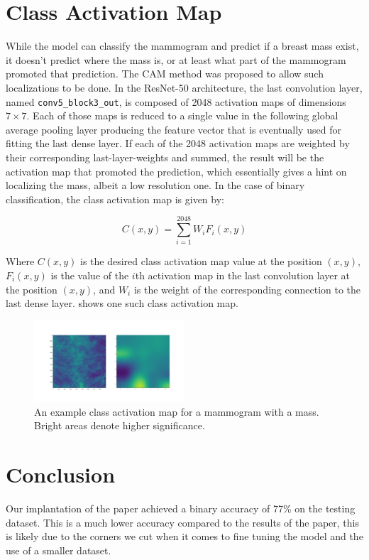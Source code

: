 \documentclass[twocolumn]{article}
\begin{document}
\section{Class Activation Map}

While the model can classify the mammogram and predict if a breast mass exist,
it doesn't predict where the mass is, or at least what part of the mammogram
promoted that prediction. The CAM method was proposed to allow such
localizations to be done. In the ResNet-50 architecture, the last convolution
layer, named \texttt{conv5\_block3\_out}, is composed of 2048 activation maps of
dimensions $7 \times 7$. Each of those maps is reduced to a single value in the
following global average pooling layer producing the feature vector that is
eventually used for fitting the last dense layer. If each of the 2048 activation
maps are weighted by their corresponding last-layer-weights and summed, the
result will be the activation map that promoted the prediction, which
essentially gives a hint on localizing the mass, albeit a low resolution one. In
the case of binary classification, the class activation map is given by:

\begin{equation}
  C(x, y) = \sum_{i = 1}^{2048}{W_i F_i(x, y)}
\end{equation}

Where $C(x, y)$ is the desired class activation map value at the position $(x,
y)$, $F_i(x, y)$ is the value of the $i$th activation map in the last
convolution layer at the position $(x, y)$, and $W_i$ is the weight of the
corresponding connection to the last dense layer. 
shows one such class activation map.

\begin{figure}
\begin{center}
  \includegraphics[width=0.5\textwidth]{classActivationMap}
\end{center}
\caption{An example class activation map for a mammogram with a mass. Bright
  areas denote higher significance.}
\label{fig:ClassActivationMap}
\end{figure}

\section{Conclusion}

Our implantation of the paper achieved a binary accuracy of 77\% on the testing
dataset. This is a much lower accuracy compared to the results of the paper,
this is likely due to the corners we cut when it comes to fine tuning the model
and the use of a smaller dataset.

\printbibliography
\end{document}
